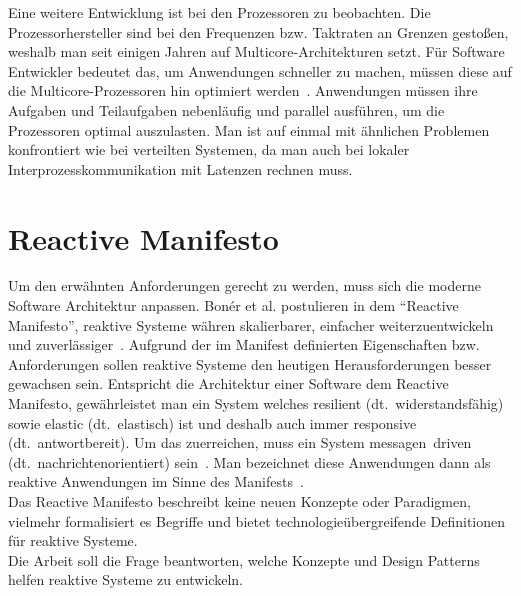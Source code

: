 Eine weitere Entwicklung ist bei den Prozessoren zu beobachten. Die Prozessorhersteller sind bei den Frequenzen bzw. Taktraten an Grenzen gestoßen, weshalb man seit einigen Jahren auf Multicore-Architekturen setzt. Für Software Entwickler bedeutet das, um Anwendungen schneller zu machen, müssen diese auf die Multicore-Prozessoren hin optimiert werden~\cite[S. 15]{butcher_seven_2014}. Anwendungen müssen ihre Aufgaben und Teilaufgaben nebenläufig und parallel ausführen, um die Prozessoren optimal auszulasten. Man ist auf einmal mit ähnlichen Problemen konfrontiert wie bei verteilten Systemen, da man auch bei lokaler Interprozesskommunikation mit Latenzen rechnen muss.

\pagebreak

\section{Reactive Manifesto}
Um den erwähnten Anforderungen gerecht zu werden, muss sich die moderne Software Architektur anpassen. Bonér et al. postulieren in dem \enquote{Reactive Manifesto}, reaktive Systeme währen skalierbarer, einfacher weiterzuentwickeln und zuverlässiger~\cite{boner_reactive_2014}. Aufgrund der im Manifest definierten Eigenschaften bzw. Anforderungen sollen reaktive Systeme den heutigen Herausforderungen besser gewachsen sein. Entspricht die Architektur einer Software dem Reactive Manifesto, gewährleistet man ein System welches resilient (dt.~widerstandsfähig) sowie elastic (dt.~elastisch) ist und deshalb auch immer responsive (dt.~antwortbereit). Um das zuerreichen, muss ein System messagen~driven (dt.~nachrichtenorientiert) sein~\cite[S.~5]{vernon_reactive_2016}. Man bezeichnet diese Anwendungen dann als reaktive Anwendungen im Sinne des Manifests~\cite{boner_reactive_2014}.\\
Das Reactive Manifesto beschreibt keine neuen Konzepte oder Paradigmen, vielmehr formalisiert es Begriffe und bietet technologieübergreifende Definitionen für reaktive Systeme.\\
Die Arbeit soll die Frage beantworten, welche Konzepte und Design Patterns helfen reaktive Systeme zu entwickeln.

